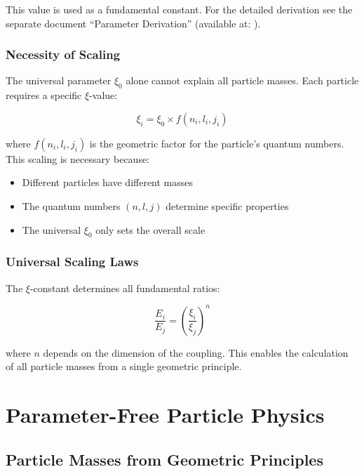\begin{important}
	This value is used as a fundamental constant. For the detailed derivation 
	see the separate document ``Parameter Derivation'' 
	(available at: ).
\end{important}

\subsection{Necessity of Scaling}

The universal parameter $\xi_0$ alone cannot explain all particle masses. Each particle requires a specific $\xi$-value:

\begin{equation}
	\xi_i = \xi_0 \times f(n_i, l_i, j_i)
\end{equation}

where $f(n_i, l_i, j_i)$ is the geometric factor for the particle's quantum numbers. This scaling is necessary because:

\begin{itemize}
	\item Different particles have different masses
	\item The quantum numbers $(n, l, j)$ determine specific properties
	\item The universal $\xi_0$ only sets the overall scale
\end{itemize}

\subsection{Universal Scaling Laws}

The $\xi$-constant determines all fundamental ratios:

\begin{equation}
	\frac{E_i}{E_j} = \left(\frac{\xi_i}{\xi_j}\right)^n
\end{equation}

where $n$ depends on the dimension of the coupling. This enables the calculation of all particle masses from a single geometric principle.
	\chapter{Parameter-Free Particle Physics}
	
	\section{Particle Masses from Geometric Principles}
	
